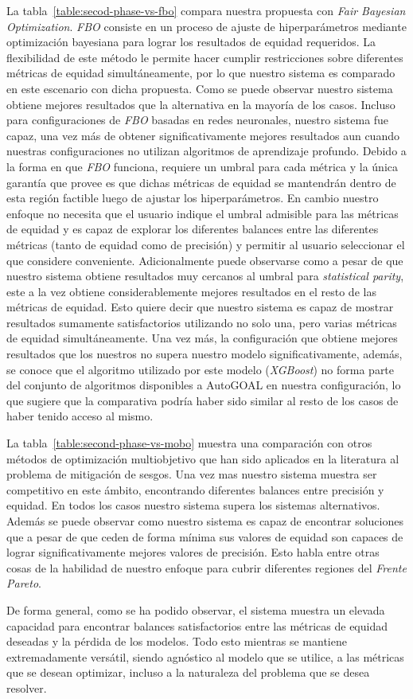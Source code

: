 La tabla~\ref{table:secod-phase-vs-fbo} compara nuestra propuesta con \emph{Fair Bayesian Optimization}.
\emph{FBO} consiste en un proceso de ajuste de hiperparámetros mediante optimización bayesiana para lograr los resultados de equidad requeridos.
La flexibilidad de este método le permite hacer cumplir restricciones sobre diferentes métricas de equidad simultáneamente, por lo que nuestro sistema es comparado en este escenario con dicha propuesta.
Como se puede observar nuestro sistema obtiene mejores resultados que la alternativa en la mayoría de los casos.
Incluso para configuraciones de \emph{FBO} basadas en redes neuronales, nuestro sistema fue capaz, una vez más de obtener significativamente mejores resultados aun cuando nuestras configuraciones no utilizan algoritmos de aprendizaje profundo.
Debido a la forma en que \emph{FBO} funciona, requiere un umbral para cada métrica y la única garantía que provee es que dichas métricas de equidad se mantendrán dentro de esta región factible luego de ajustar los hiperparámetros.
En cambio nuestro enfoque no necesita que el usuario indique el umbral admisible para las métricas de equidad y es capaz de explorar los diferentes balances entre las diferentes métricas (tanto de equidad como de precisión) y permitir al usuario seleccionar el que considere conveniente.
Adicionalmente puede observarse como a pesar de que nuestro sistema obtiene resultados muy cercanos al umbral para \emph{statistical parity}, este a la vez obtiene considerablemente mejores resultados en el resto de las métricas de equidad.
Esto quiere decir que nuestro sistema es capaz de mostrar resultados sumamente satisfactorios utilizando no solo una, pero varias métricas de equidad simultáneamente.
Una vez más, la configuración que obtiene mejores resultados que los nuestros no supera nuestro modelo significativamente, además, se conoce que el algoritmo utilizado por este modelo (\emph{XGBoost}) no forma parte del conjunto de algoritmos disponibles a AutoGOAL en nuestra configuración, lo que sugiere que la comparativa podría haber sido similar al resto de los casos de haber tenido acceso al mismo.

La tabla~\ref{table:second-phase-vs-mobo} muestra una comparación con otros métodos de optimización multiobjetivo que han sido aplicados en la literatura al problema de mitigación de sesgos.
Una vez mas nuestro sistema muestra ser competitivo en este ámbito, encontrando diferentes balances entre precisión y equidad.
En todos los casos nuestro sistema supera los sistemas alternativos.
Además se puede observar como nuestro sistema es capaz de encontrar soluciones que a pesar de que ceden de forma mínima sus valores de equidad son capaces de lograr significativamente mejores valores de precisión.
Esto habla entre otras cosas de la habilidad de nuestro enfoque para cubrir diferentes regiones del \emph{Frente Pareto}.

De forma general, como se ha podido observar, el sistema muestra un elevada capacidad para encontrar balances satisfactorios entre las métricas de equidad deseadas y la pérdida de los modelos.
Todo esto mientras se mantiene extremadamente versátil, siendo agnóstico al modelo que se utilice, a las métricas que se desean optimizar, incluso a la naturaleza del problema que se desea resolver.
